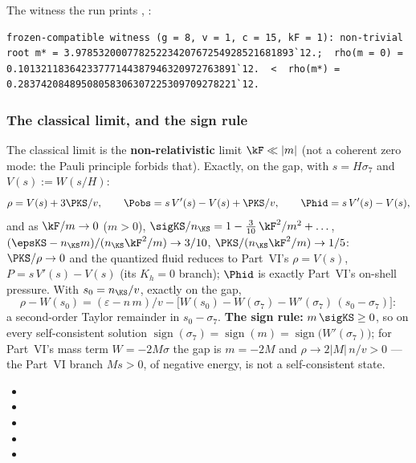 The witness the run prints , :
\begin{Verbatim}[fontsize=\scriptsize]
  frozen-compatible witness (g = 8, v = 1, c = 15, kF = 1): non-trivial root m* = 3.97853200077825223420767254928521681893`12.;  rho(m = 0) = 0.10132118364233777144387946320972763891`12.  <  rho(m*) = 0.28374208489508058306307225309709278221`12.
\end{Verbatim}

\subsubsection{The classical limit, and the sign rule}
\label{sec:4.5.8}

The classical limit is the \textbf{non-relativistic} limit $\kF\ll|m|$ (not a coherent zero mode: the
Pauli principle forbids that). Exactly, on the gap, with $s=H\sigma_7$ and $V(s):=W(s/H)$:
\[
  \rho=V(s)+3\PKS/v,\qquad \Pobs=s\,V'(s)-V(s)+\PKS/v,\qquad \Phid=s\,V'(s)-V(s),
\]
and as $\kF/m\to0$ ($m>0$), $\sigKS/n_{\KS}=1-\tfrac{3}{10}\,\kF^2/m^2+\dots$,
$(\epsKS-n_{\KS}m)/(n_{\KS}\kF^2/m)\to3/10$, $\PKS/(n_{\KS}\kF^2/m)\to1/5$: $\PKS/\rho\to0$ and the quantized
fluid reduces to Part~VI's $\rho=V(s)$, $P=s\,V'(s)-V(s)$ (its $K_h=0$ branch); $\Phid$ is exactly Part~VI's
on-shell pressure. With $s_0=n_{\KS}/v$, exactly on the gap,
\[
  \rho-W(s_0)=(\varepsilon-n\,m)/v-\bigl[W(s_0)-W(\sigma_7)-W'(\sigma_7)\,(s_0-\sigma_7)\bigr]:
\]
a second-order Taylor remainder in $s_0-\sigma_7$. \textbf{The sign rule:} $m\,\sigKS\geq0$, so on every
self-consistent solution $\operatorname{sign}(\sigma_7)=\operatorname{sign}(m)=\operatorname{sign}\bigl(W'(\sigma_7)\bigr)$;
for Part~VI's mass term $W=-2M\sigma$ the gap is $m=-2M$ and $\rho\to2|M|\,n/v>0$ --- the Part~VI branch
$Ms>0$, of negative energy, is not a self-consistent state. 
\begin{itemize}
  \item {}
  \item {}
  \item {}
  \item {}
  \item {}
\end{itemize}
